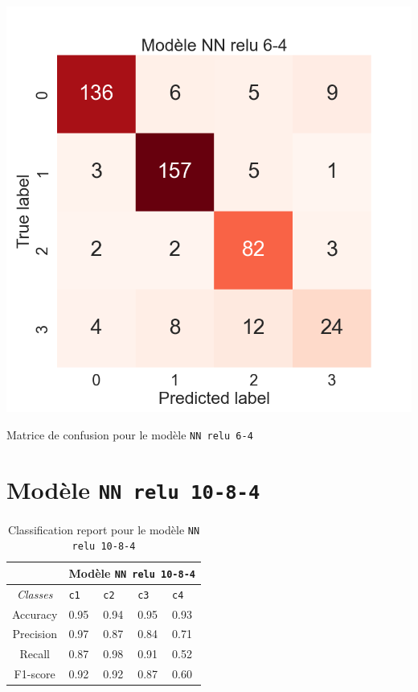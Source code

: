 \begin{table}[H]
    \includegraphics[scale=0.5]{images/y_pred_NN_relu_6-4.png}
    \caption{\label{HomePage} Matrice de confusion pour le modèle \texttt{NN relu 6-4}}
\end{table}

\newpage

\section{Modèle \texttt{NN relu 10-8-4}}

\begin{table}[ht]
  \begin{tabular}{ m{5em} | m{1cm}| m{1cm} | m{1cm}| m{1cm} | } 
  \cline{2-5}
             & \multicolumn{4}{|c|}{Modèle \texttt{NN relu 10-8-4}}\\
 \hline
 \multicolumn{1}{|c|}{\textit{Classes}} & \hfil \texttt{c1} & \hfil \texttt{c2} & \hfil \texttt{c3} & \hfil \texttt{c4} \\ 
  \hline
  \multicolumn{1}{|c|}{Accuracy} & \hfil 0.95 & \hfil 0.94 & \hfil 0.95 & \hfil 0.93 \\ 
  \hline
  \multicolumn{1}{|c|}{Precision} & \hfil 0.97 & \hfil 0.87 & \hfil 0.84 & \hfil 0.71 \\ 
  \hline
  \multicolumn{1}{|c|}{Recall} & \hfil 0.87 & \hfil 0.98 & \hfil 0.91 & \hfil 0.52 \\ 
  \hline
  \multicolumn{1}{|c|}{F1-score} & \hfil 0.92 & \hfil 0.92 & \hfil 0.87 & \hfil 0.60 \\ 
  \hline
\end{tabular}
\caption{Classification report pour le modèle \texttt{NN relu 10-8-4}}
  \label{Tab:Tcr}
\end{table}

